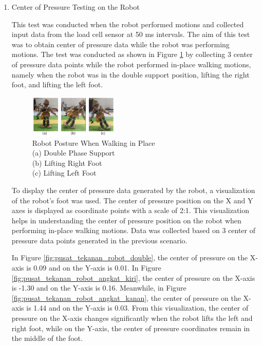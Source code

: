 \begin{enumerate}[label=\Alph*.]
\newpage

    \item Center of Pressure Testing on the Robot
    \label{subsec:hasil-pembahasan-pusat-tekanan}
        
        \hspace*{1em} This test was conducted when the robot performed motions and collected input data from the load cell sensor at 50 ms intervals. The aim of this test was to obtain center of pressure data while the robot was performing motions. The test was conducted as shown in Figure \ref{fig:pusat_tekanan_robot} by collecting 3 center of pressure data points while the robot performed in-place walking motions, namely when the robot was in the double support position, lifting the right foot, and lifting the left foot.
        
        \begin{figure}[h]
            \centering
            \includegraphics[width=0.4\textwidth]{gambar/hasil/jalan_ditempat.png}
            \caption{Robot Posture When Walking in Place \\ (a) Double Phase Support \\ (b) Lifting Right Foot \\ (c) Lifting Left Foot}
            \label{fig:pusat_tekanan_robot}
        \end{figure}
        
        \hspace*{1em} To display the center of pressure data generated by the robot, a visualization of the robot's foot was used. The center of pressure position on the X and Y axes is displayed as coordinate points with a scale of 2:1. This visualization helps in understanding the center of pressure position on the robot when performing in-place walking motions. Data was collected based on 3 center of pressure data points generated in the previous scenario.
        
        \hspace*{1em} In Figure \ref{fig:pusat_tekanan_robot_double}, the center of pressure on the X-axis is 0.09 and on the Y-axis is 0.01. In Figure \ref{fig:pusat_tekanan_robot_angkat_kiri}, the center of pressure on the X-axis is -1.30 and on the Y-axis is 0.16. Meanwhile, in Figure \ref{fig:pusat_tekanan_robot_angkat_kanan}, the center of pressure on the X-axis is 1.44 and on the Y-axis is 0.03. From this visualization, the center of pressure on the X-axis changes significantly when the robot lifts the left and right foot, while on the Y-axis, the center of pressure coordinates remain in the middle of the foot.
        

\end{enumerate}
